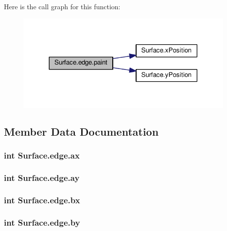 Here is the call graph for this function\-:
\nopagebreak
\begin{figure}[H]
\begin{center}
\leavevmode
\includegraphics[width=308pt]{classSurface_1_1edge_ab90affbc78ce2173f0b24fdf7253e804_cgraph}
\end{center}
\end{figure}




\subsection{Member Data Documentation}
\hypertarget{classSurface_1_1edge_aed43591a3fe7728cc347928008cfa579}{
\subsubsection[{ax}]{\setlength{\rightskip}{0pt plus 5cm}int Surface.\-edge.\-ax\hspace{0.3cm}{\ttfamily [private]}}}\label{classSurface_1_1edge_aed43591a3fe7728cc347928008cfa579}
\hypertarget{classSurface_1_1edge_af2254cfb68bedb7a51cacf4bf8cfe13a}{
\subsubsection[{ay}]{\setlength{\rightskip}{0pt plus 5cm}int Surface.\-edge.\-ay\hspace{0.3cm}{\ttfamily [private]}}}\label{classSurface_1_1edge_af2254cfb68bedb7a51cacf4bf8cfe13a}
\hypertarget{classSurface_1_1edge_a2616848b60d8c4cb1b54051e5b506ef8}{
\subsubsection[{bx}]{\setlength{\rightskip}{0pt plus 5cm}int Surface.\-edge.\-bx\hspace{0.3cm}{\ttfamily [private]}}}\label{classSurface_1_1edge_a2616848b60d8c4cb1b54051e5b506ef8}
\hypertarget{classSurface_1_1edge_a145fb9d9320682cd556ac931a5bcde62}{
\subsubsection[{by}]{\setlength{\rightskip}{0pt plus 5cm}int Surface.\-edge.\-by\hspace{0.3cm}{\ttfamily [private]}}}\label{classSurface_1_1edge_a145fb9d9320682cd556ac931a5bcde62}


